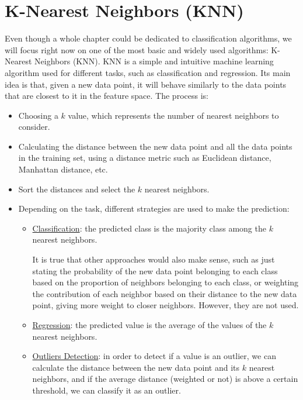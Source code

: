 \section{K-Nearest Neighbors (KNN)}\label{sec:knn}

Even though a whole chapter could be dedicated to classification algorithms, we will focus right now on one of the most basic and widely used algorithms: K-Nearest Neighbors (KNN). KNN is a simple and intuitive machine learning algorithm used for different tasks, such as classification and regression. Its main idea is that, given a new data point, it will behave similarly to the data points that are closest to it in the feature space. The process is:
\begin{itemize}
    \item Choosing a $k$ value, which represents the number of nearest neighbors to consider.
    \item Calculating the distance between the new data point and all the data points in the training set, using a distance metric such as Euclidean distance, Manhattan distance, etc.
    \item Sort the distances and select the $k$ nearest neighbors.
    \item Depending on the task, different strategies are used to make the prediction:
    \begin{itemize}
        \item \ul{Classification}: the predicted class is the majority class among the $k$ nearest neighbors.
        
        It is true that other approaches would also make sense, such as just stating the probability of the new data point belonging to each class based on the proportion of neighbors belonging to each class, or weighting the contribution of each neighbor based on their distance to the new data point, giving more weight to closer neighbors. However, they are not used.

        \item \ul{Regression}: the predicted value is the average of the values of the $k$ nearest neighbors.

        \item \ul{Outliers Detection}: in order to detect if a value is an outlier, we can calculate the distance between the new data point and its $k$ nearest neighbors, and if the average distance (weighted or not) is above a certain threshold, we can classify it as an outlier.
    \end{itemize}
\end{itemize}